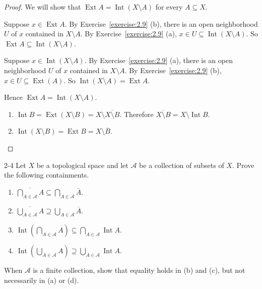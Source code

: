 \begin{proof}
	We will show that $\operatorname{Ext}A = \operatorname{Int}(X\setminus A)$ for every $A\subseteq X$.

	Suppose $x\in \operatorname{Ext}A$. By Exercise~\ref{exercise:2.9} (b), there is an open neighborhood $U$ of $x$ contained in $X\setminus A$. By Exercise~\ref{exercise:2.9} (a), $x\in U\subseteq \operatorname{Int}(X\setminus A)$. So $\operatorname{Ext}A \subseteq \operatorname{Int}(X\setminus A)$.

	Suppose $x\in \operatorname{Int}(X\setminus A)$. By Exercise~\ref{exercise:2.9} (a), there is an open neighborhood $U$ of $x$ contained in $X\setminus A$. By Exercise~\ref{exercise:2.9} (b), $x\in U\subseteq \operatorname{Ext}(A)$. So $\operatorname{Int}(X\setminus A) = \operatorname{Ext} A$.

	Hence $\operatorname{Ext}A = \operatorname{Int}(X\setminus A)$.
	\begin{enumerate}[label={(\alph*)}]
		\item $\operatorname{Int}B = \operatorname{Ext}(X\setminus B) = X\setminus\overline{X\setminus B}$. Therefore $\overline{X\setminus B} = X\setminus\operatorname{Int}B$.
		\item $\operatorname{Int}(X\setminus B) = \operatorname{Ext}B = X\setminus\overline{B}$.
	\end{enumerate}
\end{proof}

\begin{problem}{2-4}
Let $X$ be a topological space and let $\mathscr{A}$ be a collection of subsets of $X$. Prove
the following containments.

\begin{enumerate}[label={(\alph*)}]
	\item $\displaystyle\overline{\bigcap_{A\in\mathscr{A}}A} \subseteq \bigcap_{A\in\mathscr{A}}\overline{A}$.
	\item $\displaystyle\overline{\bigcup_{A\in\mathscr{A}}A} \supseteq \bigcup_{A\in\mathscr{A}}\overline{A}$.
	\item $\displaystyle\operatorname{Int}\left(\bigcap_{A\in\mathscr{A}}A\right)\subseteq \bigcap_{A\in\mathscr{A}}\operatorname{Int}A$.
	\item $\displaystyle\operatorname{Int}\left(\bigcup_{A\in\mathscr{A}}A\right)\supseteq \bigcup_{A\in\mathscr{A}}\operatorname{Int}A$.
\end{enumerate}

When $\mathscr{A}$ is a finite collection, show that equality holds in (b) and (c), but not necessarily in (a) or (d).
\end{problem}


